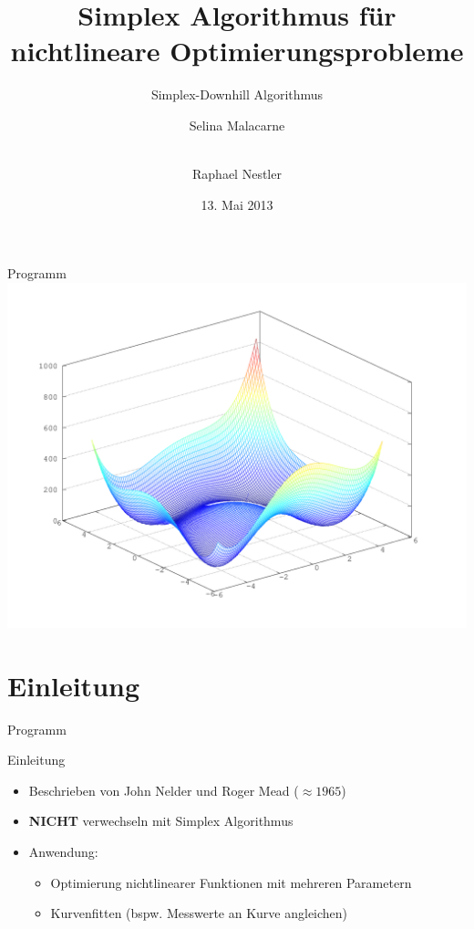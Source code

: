 \documentclass[\outputformat]{beamer}
\author{Selina Malacarne \and\\ Raphael Nestler}
\title{Simplex Algorithmus für nichtlineare Optimierungsprobleme}
\subtitle{Simplex-Downhill Algorithmus}
\date{13. Mai 2013}
\begin{document}
\begin{frame}
\titlepage
\end{frame}

\begin{frame}{Programm}
\tableofcontents
\includegraphics[height=0.5\paperheight]{himmelblau.png}
\end{frame}

\section{Einleitung} 
\begin{frame}{Programm}\tableofcontents[currentsection]\end{frame}

\begin{frame}{Einleitung}
	\begin{itemize}
		\pause\item Beschrieben von John Nelder und Roger Mead ($\approx 1965$)
		\pause\item \textbf{NICHT} verwechseln mit Simplex Algorithmus
		\pause\item Anwendung: 
		\begin{itemize}
			\pause\item Optimierung nichtlinearer Funktionen mit mehreren Parametern 
			\pause\item Kurvenfitten (bspw. Messwerte an Kurve angleichen)
		\end{itemize}	
	\end{itemize}
\end{frame}
\end{document}
